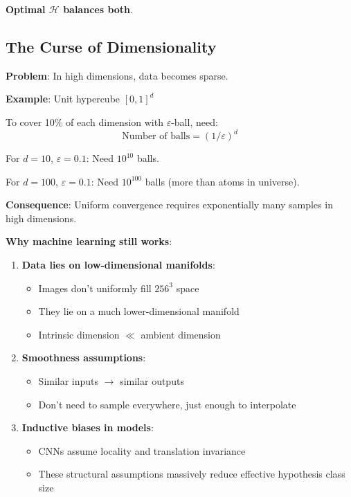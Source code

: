 \documentclass[11pt,oneside]{book}
\begin{document}
\textbf{Optimal $\mathcal{H}$ balances both}.

\subsection{The Curse of Dimensionality}

\textbf{Problem}: In high dimensions, data becomes sparse.

\textbf{Example}: Unit hypercube $[0,1]^d$

To cover 10\% of each dimension with $\varepsilon$-ball, need:
\begin{equation}
\text{Number of balls} = (1/\varepsilon)^d
\end{equation}

For $d=10$, $\varepsilon=0.1$: Need $10^{10}$ balls.

For $d=100$, $\varepsilon=0.1$: Need $10^{100}$ balls (more than atoms in universe).

\textbf{Consequence}: Uniform convergence requires exponentially many samples in high dimensions.

\textbf{Why machine learning still works}:

\begin{enumerate}
    \item \textbf{Data lies on low-dimensional manifolds}:
    \begin{itemize}
        \item Images don't uniformly fill $256^3$ space
        \item They lie on a much lower-dimensional manifold
        \item Intrinsic dimension $\ll$ ambient dimension
    \end{itemize}

    \item \textbf{Smoothness assumptions}:
    \begin{itemize}
        \item Similar inputs $\rightarrow$ similar outputs
        \item Don't need to sample everywhere, just enough to interpolate
    \end{itemize}

    \item \textbf{Inductive biases in models}:
    \begin{itemize}
        \item CNNs assume locality and translation invariance
        \item These structural assumptions massively reduce effective hypothesis class size
    \end{itemize}
\end{enumerate}
\end{document}
